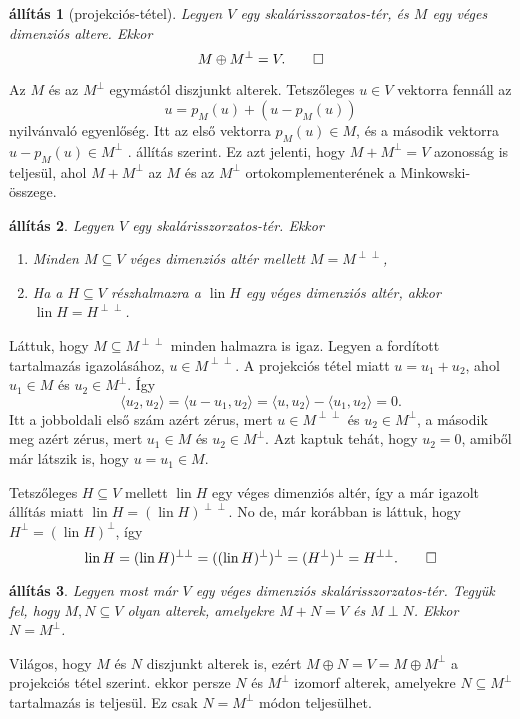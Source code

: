 \documentclass[a4paper, showtrims]{memoir}
\makeatletter
\renewenvironment{proof}[1][\proofname]
    {\par\pushQED{\qed}%
    \normalfont \topsep6\p@\@plus6\p@\relax
    \trivlist
    \item[\hskip\labelsep
        \itshape
    #1\@addpunct{:}]\ignorespaces}
    {\popQED\endtrivlist\@endpefalse}
\theoremstyle{plain}
\newtheorem{proposition}{állítás}[chapter]
\theoremstyle{remark}
\theoremstyle{definition}
\DeclareMathOperator{\lin}{lin}
\newcommand{\ip}[2]{\langle#1,#2\rangle}
\makeatother
\begin{document}
\begin{proposition}[projekciós-tétel]\label{pr:projekcios}
	Legyen $V$ egy skalárisszorzatos-tér, és $M$ egy véges dimenziós altere.
	Ekkor
	\[
		M\oplus M^\perp=V.
		\qedhere
	\]
\end{proposition}
\begin{proof}
	Az $M$ és az $M^\perp$ egymástól diszjunkt alterek.
	Tetszőleges $u\in V$ vektorra fennáll az
	\[
		u=p_M\left( u \right)+\left( u-p_M\left( u \right) \right)
	\]
	nyilvánvaló egyenlőség.
	Itt az első vektorra $p_M\left( u \right)\in M$, és a második vektorra $u-p_M\left( u \right)\in M^\perp$
    . állítás szerint.
	Ez azt jelenti, hogy $M+M^\perp=V$ azonosság is teljesül,
	ahol $M+M^\perp$ az $M$ és az $M^\perp$ ortokomplementerének a Minkowski-összege.
\end{proof}
\begin{proposition}
	Legyen $V$ egy skalárisszorzatos-tér.
	Ekkor
	\begin{enumerate}
		\item Minden $M\subseteq V$ véges dimenziós altér mellett $M=M^{\perp\perp}$,
		\item Ha a $H\subseteq V$ részhalmazra a $\lin H$ egy véges dimenziós altér, 
            akkor $\lin H=H^{\perp\perp}$.
		      \qedhere
	\end{enumerate}
\end{proposition}
\begin{proof}
	Láttuk, hogy $M\subseteq M^{\perp\perp}$ minden halmazra is igaz.
	Legyen a fordított tartalmazás igazolásához,
	$u\in M^{\perp\perp}$.
	A projekciós tétel miatt $u=u_1+u_2$,
	ahol $u_1\in M$ és $u_2\in M^{\perp}$.
	Így
	\[
		\ip{u_2}{u_2}
		=
		\ip{u-u_1}{u_2}
		=
		\ip{u}{u_2}-\ip{u_1}{u_2}=0.
	\]
	Itt a jobboldali első szám azért zérus,
	mert $u\in M^{\perp\perp}$ és $u_2\in M^\perp$,
	a második meg azért zérus,
	mert $u_1\in M$ és $u_2\in M^\perp$.
	Azt kaptuk tehát, hogy $u_2=0$, amiből már látszik is, hogy $u=u_1\in M$.

	Tetszőleges $H\subseteq V$ mellett $\lin H$ egy véges dimenziós altér,
	így a már igazolt állítás miatt
	$\lin H=(\lin H)^{\perp\perp}$.
	No de, már korábban is láttuk, hogy
	$H^{\perp}=(\lin H)^\perp$, így
	\[
		\lin H
		=
		(\lin H)^{\perp\perp}
		=
		((\lin H)^\perp)^\perp=(H^{\perp})^\perp=H^{\perp\perp}.
		\qedhere
	\]
\end{proof}
\begin{proposition}
    Legyen most már $V$ egy véges dimenziós skalárisszorzatos-tér.
    Tegyük fel, hogy $M,N\subseteq V$ olyan alterek, amelyekre $M+N=V$ és $M\perp N$.
    Ekkor $N=M^\perp$.
\end{proposition}
\begin{proof}
    Világos, hogy $M$ és $N$ diszjunkt alterek is, ezért $M\oplus N=V=M\oplus M^\perp$
    a projekciós tétel szerint.
    ekkor persze $N$ és $M^\perp$ izomorf alterek, amelyekre $N\subseteq M^\perp$ tartalmazás is teljesül.
    Ez csak $N=M^\perp$ módon teljesülhet.
\end{proof}
\end{document}
